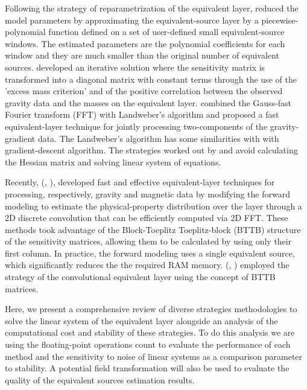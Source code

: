 Following the strategy of reparametrization of the equivalent layer, \cite{oliveirajr-etal2013} reduced the model parameters by approximating the equivalent-source layer by a piecewise-polynomial function defined on a set of user-defined small equivalent-source windows. The estimated parameters are the polynomial coefficients for each window and they are much smaller than the original number of equivalent sources. \cite{siqueira-etal2017} developed an iterative solution where the sensitivity matrix is transformed into a diagonal matrix with constant terms through the use of the 'excess mass criterion' and of the positive correlation between the observed gravity data and the masses on the equivalent layer. \cite{jirigalatu-ebbing2019} combined the Gauss-fast Fourier transform (FFT) with Landweber's algorithm and proposed a fast equivalent-layer technique for jointly processing two-components of the gravity-gradient data.
The Landweber's algorithm has some similarities with with gradient-descent algorithm. The strategies worked out by \cite{siqueira-etal2017} and \cite{jirigalatu-ebbing2019} avoid calculating the Hessian matrix and solving linear system of equations.

Recently, \citeauthor{takahashi2020} (\citeyear{takahashi2020}, \citeyear{takahashi2022}), developed fast and effective equivalent-layer techniques for processing, respectively,  gravity and magnetic data by modifying the forward modeling to estimate the physical-property distribution  over the layer through a 2D discrete convolution that can be efficiently computed via 2D FFT.
These methods took advantage of the Block-Toeplitz Toeplitz-block (BTTB) structure of the sensitivity matrices, allowing them to be calculated by using only their first column.
In practice, the forward modeling uses a single equivalent source, which significantly reduces the the required RAM memory. \citeauthor{takahashi2020} (\citeyear{takahashi2020}, \citeyear{takahashi2022}) employed the strategy of the convolutional equivalent layer using the concept of  BTTB matrices.

Here, we present a comprehensive review of diverse strategies methodologies to solve the linear system of the equivalent layer alongside an analysis of the computational cost and stability of these strategies.
To do this analysis we are using the floating-point operations count to evaluate the performance of each method and the sensitivity to noise of linear systems as a comparison parameter to stability. A potential field transformation will also be used to evaluate the quality of the equivalent sources estimation results.